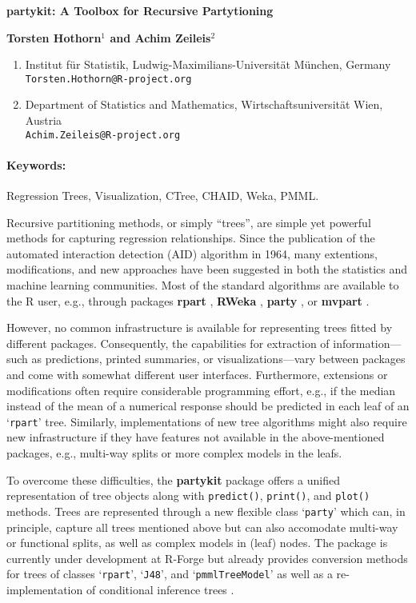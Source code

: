\documentclass[10pt,a4paper]{article}
\renewcommand{\title}[1]{\begin{center}{\bf \LARGE #1}\end{center}}
\renewcommand{\author}[1]{\begin{center}{\bf #1}\end{center}}
\newenvironment{affiliations}{\footnotesize \begin{enumerate}}{\end{enumerate}}
\newenvironment{keywords}{\paragraph{Keywords:}}{\bigskip}
\let\code=\texttt
\let\pkg=\textbf
\let\proglang=\textsf
\newcommand{\class}[1]{`\code{#1}'}
\begin{document}
\pagestyle{empty}

\title{\pkg{partykit}: A Toolbox for Recursive Partytioning}
\author{Torsten Hothorn$^{1}$ and Achim Zeileis$^{2}$}

\begin{affiliations}
  \item Institut f\"ur Statistik, Ludwig-Maximilians-Universit\"at M\"unchen, Germany\\
        \texttt{Torsten.Hothorn@R-project.org}
  \item Department of Statistics and Mathematics, Wirtschaftsuniversit\"at Wien, Austria\\
        \texttt{Achim.Zeileis@R-project.org}
\end{affiliations}

\begin{keywords}
Regression Trees, Visualization, CTree, CHAID, Weka, PMML.
\end{keywords}

Recursive partitioning methods, or simply ``trees'', are simple yet powerful
methods for capturing regression relationships. Since the publication of the
automated interaction detection (AID) algorithm in 1964, many extentions,
modifications, and new approaches have been suggested in both the statistics
and machine learning communities. Most of the standard algorithms are
available to the \proglang{R} user, e.g., through packages
\pkg{rpart} \citep{PKG:rpart},
\pkg{RWeka} \citep{PKG:RWeka},
\pkg{party} \citep{PKG:party}, or
\pkg{mvpart} \citep{PKG:mvpart}.

However, no common infrastructure is available for representing trees
fitted by different packages. Consequently, the capabilities for extraction of
information---such as predictions, printed summaries, or visualizations---vary
between packages and come with somewhat different user interfaces.
Furthermore, extensions or modifications often require considerable
programming effort, e.g., if the median instead of the mean of a numerical
response should be predicted in each leaf of an \class{rpart} tree.
Similarly, implementations of new tree algorithms might also require new
infrastructure if they have features not available in the above-mentioned
packages, e.g., multi-way splits or more complex models in the leafs.

To overcome these difficulties, the \pkg{partykit} package \citep{PKG:partykit} offers a 
unified representation of tree objects along with \code{predict()}, 
\code{print()}, and \code{plot()} methods. Trees are represented through 
a new flexible class \class{party} which can, in principle, capture
all trees mentioned above but can also accomodate multi-way or functional
splits, as well as complex models in (leaf) nodes. The package is currently
under development at R-Forge but already provides conversion methods for
trees of classes \class{rpart}, \class{J48}, and \class{pmmlTreeModel}
as well as a re-implementation of conditional inference trees \citep{Hothorn:2006:JCGS}.
\end{document}
